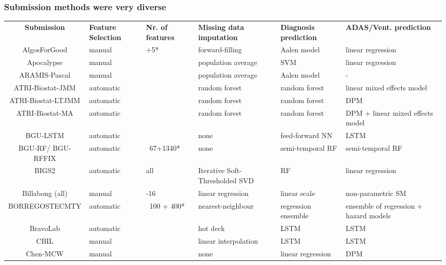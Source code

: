 \documentclass[8pt,xcolor=table,aspectratio=169]{beamer}
\begin{document}
\begin{frame}
\frametitle{Submission methods were very diverse}



\begin{table}
 \centering
 \fontsize{4}{6}\selectfont
 \begin{tabular}{c | >{\centering\arraybackslash}p{1.3cm} >{\centering\arraybackslash}p{1.2cm} >{\centering\arraybackslash}p{2cm} >{\centering\arraybackslash}p{2cm} >{\centering\arraybackslash}p{2cm}}
\textbf{Submission} & \textbf{Feature Selection}  & \textbf{Nr. of features} & \textbf{Missing data imputation} & \textbf{Diagnosis prediction} & \textbf{ADAS/Vent. prediction}\\
\Xhline{1.5\arrayrulewidth}
AlgosForGood & manual & 16+5* & forward-filling & Aalen model & linear regression\\
Apocalypse & manual & 16 & population average & SVM & linear regression\\
ARAMIS-Pascal & manual & 20 & population average & Aalen model & -\\
ATRI-Biostat-JMM & automatic & 15 & random forest & random forest & linear mixed effects model\\
ATRI-Biostat-LTJMM & automatic & 15 & random forest & random forest & DPM\\
ATRI-Biostat-MA & automatic & 15 & random forest & random forest & DPM + linear mixed effects model\\
BGU-LSTM & automatic & 67 & none & feed-forward NN & LSTM\\
BGU-RF/ BGU-RFFIX & automatic & ~67+1340* & none & semi-temporal RF & semi-temporal RF\\
BIGS2 & automatic & all & Iterative Soft-Thresholded SVD & RF & linear regression\\
Billabong (all) & manual & 15-16 & linear regression & linear scale & non-parametric SM\\
BORREGOSTECMTY & automatic & ~100 + 400* & nearest-neighbour & regression ensemble & ensemble of regression + hazard models \\
BravoLab & automatic & 25 & hot deck & LSTM & LSTM\\
CBIL & manual & 21 & linear interpolation & LSTM & LSTM\\
Chen-MCW & manual & 9 & none & linear regression & DPM\\

\end{tabular}
\end{table}
\end{frame}
\end{document}
